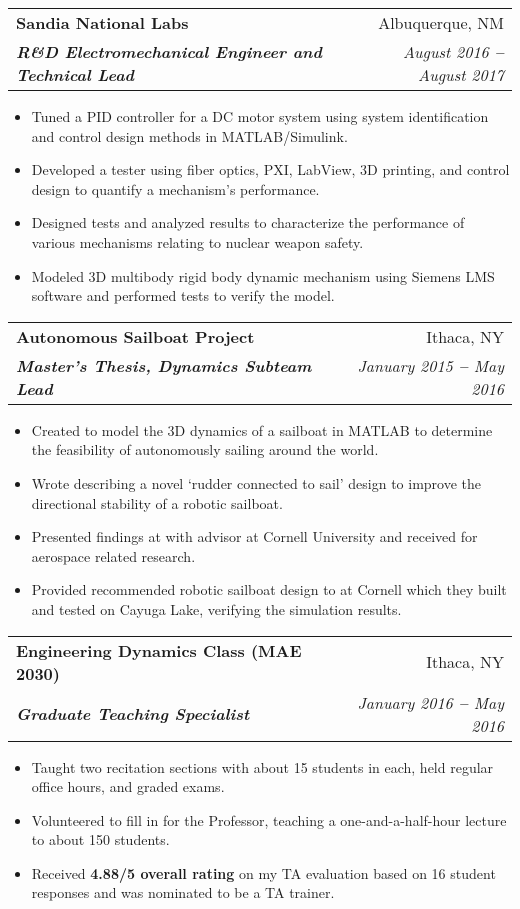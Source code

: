 \documentclass[letterpaper,11pt]{article}
\makeatletter
\newcommand{\resumeItem}[1]{
  \item\small{
    {#1}\vspace{-4pt}
  }
}
\newcommand{\resumeSubheading}[4]{
  \vspace{-2pt}\item
    \begin{tabular*}{1\textwidth}[t]{l@{\extracolsep{\fill}}r}
      \textbf{#1} & #2 \\
      \textit{\textbf{\small#3}} & \textit{\small #4} \\
    \end{tabular*}\vspace{-7pt}
}
\newcommand{\resumeItemListStart}{\begin{itemize}[leftmargin=15pt]}
\newcommand{\resumeItemListEnd}{\end{itemize}\vspace{-5pt}}
\newcommand{\bref}[2]{\href{#1}{\color{blue}{#2}}}
\makeatother
\begin{document}
\resumeSubheading
{Sandia National Labs}{Albuquerque, NM}
{R\&D Electromechanical Engineer and Technical Lead}{August 2016 \textbf{--} August 2017}
\resumeItemListStart
\resumeItem{Tuned a PID controller for a DC motor system using system identification and control design methods in MATLAB/Simulink.}
\resumeItem{Developed a tester using fiber optics, PXI, LabView, 3D printing, and control design to quantify a mechanism’s performance.}
\resumeItem{Designed tests and analyzed results to characterize the performance of various mechanisms relating to nuclear weapon safety.}
\resumeItem{Modeled 3D multibody rigid body dynamic mechanism using Siemens LMS software and performed tests to verify the model.}
\resumeItemListEnd

\resumeSubheading
{Autonomous Sailboat Project}{Ithaca, NY}
{Master’s Thesis, Dynamics Subteam Lead}{January 2015 \textbf{--} May 2016}
\resumeItemListStart
\resumeItem{Created \bref{https://github.com/jam643/SailboatSim3D/tree/master}{a simulation framework} to model the 3D dynamics of a sailboat in MATLAB to determine the feasibility of autonomously sailing around the world.}
\resumeItem{Wrote \bref{https://bpb-us-w2.wpmucdn.com/sites.coecis.cornell.edu/dist/5/91/files/2017/06/Semester-Report-Spring-2016-Jesse-Miller-1e485cb.pdf}{a thesis paper} describing a novel ‘rudder connected to sail’ design to improve the directional stability of a robotic sailboat.}
\resumeItem{Presented findings at \bref{https://robotics.cornell.edu/2019/08/14/a-directionally-self-stable-robotic-sail-boat-concept-and-simulations/}{a robotics seminar} with advisor \bref{http://ruina.tam.cornell.edu/}{Andy Ruina} at Cornell University and received \bref{https://www.mae.cornell.edu/news/sibley-school-mechanical-aerospace-engineering-student-awards-0}{the Kelly Prize} for aerospace related research.}
\resumeItem{Provided recommended robotic sailboat design to \bref{https://cusail.com/}{CUSail project team} at Cornell which they built and tested on Cayuga Lake, verifying the simulation results.}
\resumeItemListEnd

\resumeSubheading
{Engineering Dynamics Class (MAE 2030)}{Ithaca, NY}
{Graduate Teaching Specialist}{January 2016 \textbf{--} May 2016}
\resumeItemListStart
\resumeItem{Taught two recitation sections with about 15 students in each, held regular office hours, and graded exams.}
\resumeItem{Volunteered to fill in for the Professor, teaching a one-and-a-half-hour lecture to about 150 students.}
\resumeItem{Received \textbf{4.88/5 overall rating} on my TA evaluation based on 16 student responses and was nominated to be a TA trainer.}
\resumeItemListEnd
\end{document}
